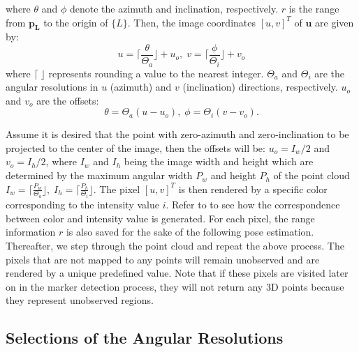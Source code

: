 where $\theta$ and $\phi$ denote the azimuth and inclination, respectively. $r$ is the range from $\mathbf{p_{L}}$ to the origin of $\{L\}$. Then, the image coordinates $[u,v]^{T}$ of  $\mathbf{u}$ are given by:
\begin{equation}	
	u = \lceil \frac{\theta}{\Theta_{a}}\rfloor + u_{o},\; v = \lceil \frac{\phi}{\Theta_{i}}\rfloor + v_{o} \label{uv}
\end{equation}
where $\lceil \; \rfloor$ represents rounding a value to the nearest integer. 
$\Theta_{a}$ and $\Theta_{i}$ are the angular resolutions in $u$ (azimuth) and $v$ (inclination) directions, respectively. $u_{o}$ and $v_{o}$ are the offsets: 
\begin{equation}	
	\theta =\Theta_{a}(u - u_{o}), \; \phi =\Theta_{i}(v - v_{o}).  \label{test11}
\end{equation} \par
Assume it is desired that the point with zero-azimuth and zero-inclination to be projected to the center of the image, then the offsets will be: $u_{o}=I_{w}/2$ and $v_{o}=I_{h}/2$, where $I_{w}$ and $I_{h}$ being the image width and height which are determined by the maximum angular width $P_{w}$ and height $P_{h}$ of the point cloud $I_{w} = \lceil \frac{P_{w}}{\Theta_{a}}\rfloor, \; I_{h} = \lceil \frac{P_{h}}{\Theta_{i}}\rfloor$. The pixel $[u,v]^{T}$ is then rendered by a specific color corresponding to the intensity value $i$. Refer to \cite{colormap,PCL} to see how the correspondence between color and intensity value is generated. For each pixel, the range information $r$ is also saved for the sake of the following pose estimation. Thereafter, we step through the point cloud and repeat the above process. The pixels that are not mapped to any points will remain unobserved and are rendered by a unique predefined value. Note that if these pixels are visited later on in the marker detection process, they will not return any 3D points because they represent unobserved regions.

\subsection{Selections of the Angular Resolutions} \label{select}

